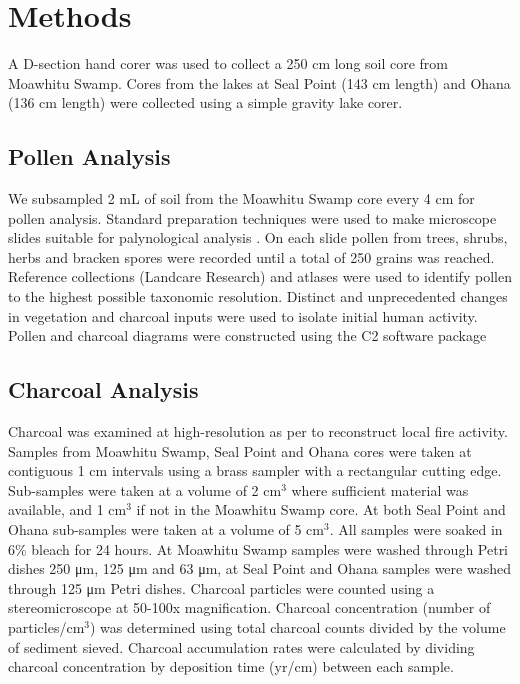 \documentclass{article}
\begin{document}

\section{Methods}

A D-section hand corer was used to collect a 250 cm long soil core from Moawhitu Swamp.  Cores from the lakes at Seal Point (143 cm length) and Ohana (136 cm length) were collected using a simple gravity lake corer.  

\subsection{Pollen Analysis}

We subsampled 2 mL of soil from the Moawhitu Swamp core every 4 cm for pollen analysis.  Standard preparation techniques were used to make microscope slides suitable for palynological analysis \citep{moore1991pollen}. On each slide pollen from trees, shrubs, herbs and bracken spores were recorded until a total of 250 grains was reached.  Reference collections (Landcare Research) and atlases \citep[e.g.][]{moar1993pollen} were used to identify pollen to the highest possible taxonomic resolution. Distinct and unprecedented changes in vegetation and charcoal inputs were used to isolate initial human activity. Pollen and charcoal diagrams were constructed using the C2 software package \citep{juggins2003software}

\subsection{Charcoal Analysis}

Charcoal was examined at high-resolution as per \cite{whitlock2002charcoal} to reconstruct local fire activity. Samples from Moawhitu Swamp, Seal Point and Ohana cores were taken at contiguous 1 cm intervals using a brass sampler with a rectangular cutting edge.  Sub-samples were taken at a volume of 2 cm$^{3}$ where sufficient material was available, and 1 cm$^{3}$ if not in the Moawhitu Swamp core. At both Seal Point and Ohana sub-samples were taken at a volume of 5 cm$^{3}$. All samples were soaked in 6\% bleach for 24 hours. At Moawhitu Swamp samples were washed through Petri dishes 250 \si{\micro\metre}, 125 \si{\micro\metre} and 63 \si{\micro\metre}, at Seal Point and Ohana samples were washed through 125 \si{\micro\metre} Petri dishes. Charcoal particles were counted using a stereomicroscope at 50-100x magnification. Charcoal concentration (number of particles/cm$^{3}$) was determined using total charcoal counts divided by the volume of sediment sieved. Charcoal accumulation rates were calculated by dividing charcoal concentration by deposition time (yr/cm) between each sample. 
\end{document}
